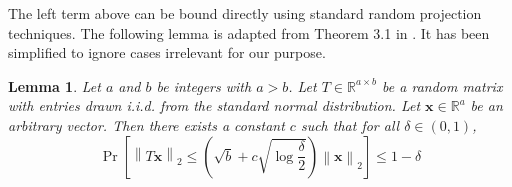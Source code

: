 \documentclass[twoside]{article}
\newtheorem{lemma}{Lemma}
\newcommand{\V}{\mathcal{V}}
\newcommand{\x}{\mathbf{x}}
\newcommand{\w}{\theta}
\newcommand{\ltwo}[1]{{\left\lVert {#1} \right\rVert}_2}
\newcommand{\proj}[1]{\pi_{{#1}}}
\newcommand{\prob}[1]{\Pr\left[{#1}\right]}
\begin{document}
{The left term above can be bound directly using standard random projection techniques.
%
The following lemma is adapted from Theorem 3.1 in \cite{matouvsek2008variants}.
It has been simplified to ignore cases irrelevant for our purpose.
\begin{lemma}
Let $a$ and $b$ be integers with $a>b$.
Let $T\in\mathbb{R}^{a\times b}$ be a random matrix with entries drawn i.i.d. from the standard normal distribution.
Let $\x\in\mathbb{R}^a$ be an arbitrary vector.
Then there exists a constant $c$ such that for all $\delta\in(0,1)$,
\begin{equation*}
\prob{\ltwo{T\x} \le \left(\sqrt{b}+c\sqrt{\log\frac{\delta}{2}}\right)\ltwo\x} \le 1-\delta
\end{equation*}
\end{lemma}
}
\end{document}
